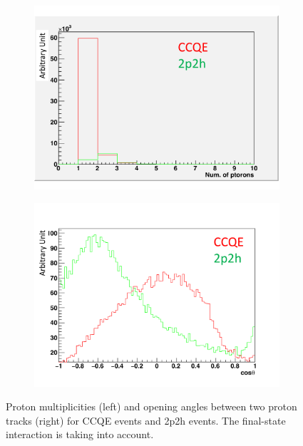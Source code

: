 %
\begin{figure}[tbhp]
 \begin{center}
  \begin{subfigure}{0.48\textwidth}
     \includegraphics[width=\linewidth]{fig/2p2h_proton_multiplicity.pdf}
    \end{subfigure}
  \begin{subfigure}{0.48\textwidth}
    \includegraphics[width=\linewidth]{fig/2p2h_proton_angle.pdf}
    \end{subfigure}    
    \end{center}
  \caption{
Proton multiplicities (left) and opening angles between two proton tracks (right) for CCQE events and 2p2h events.
The final-state interaction is taking into account.
}
\label{fig:2p2h_proton_multiplicity_angle}
\end{figure}



